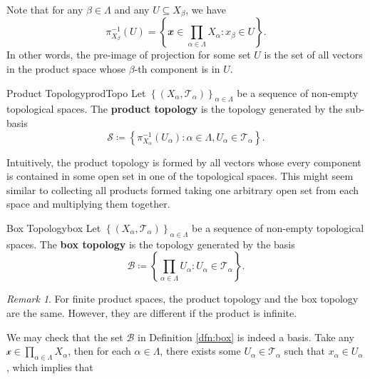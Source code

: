 \documentclass[math]{amznotes}
\theoremstyle{remark}
\newtheorem*{remark}{Remark}
\begin{document}
Note that for any $\beta \in \Lambda$ and any $U \subseteq X_{\beta}$, we have
\begin{equation*}
    \pi_{X_{\beta}}^{-1}\left(U\right) = \left\{\mathbfit{x} \in \prod_{\alpha \in \Lambda}X_{\alpha} \colon x_{\beta} \in U\right\}.
\end{equation*}
In other words, the pre-image of projection for some set $U$ is the set of all vectors in the product space whose $\beta$-th component is in $U$.
\begin{dfnbox}{Product Topology}{prodTopo}
    Let $\left\{\left(X_{\alpha}, \mathcal{T}_{\alpha}\right)\right\}_{\alpha \in \Lambda}$ be a sequence of non-empty topological spaces. The {\color{red} \textbf{product topology}} is the topology generated by the sub-basis 
    \begin{equation*}
        \mathcal{S} \coloneqq \left\{\pi_{X_{\alpha}}^{-1}\left(U_{\alpha}\right) \colon \alpha \in \Lambda, U_{\alpha} \in \mathcal{T}_{\alpha}\right\}.
    \end{equation*}
\end{dfnbox}
Intuitively, the product topology is formed by all vectors whose every component is contained in some open set in one of the topological spaces. This might seem similar to collecting all products formed taking one arbitrary open set from each space and multiplying them together.
\begin{dfnbox}{Box Topology}{box}
    Let $\left\{\left(X_{\alpha}, \mathcal{T}_{\alpha}\right)\right\}_{\alpha \in \Lambda}$ be a sequence of non-empty topological spaces. The {\color{red} \textbf{box topology}} is the topology generated by the basis 
    \begin{equation*}
        \mathcal{B} \coloneqq \left\{\prod_{\alpha \in \Lambda}U_{\alpha} \colon U_{\alpha} \in \mathcal{T}_{\alpha}\right\}.
    \end{equation*}
\end{dfnbox}
\begin{notebox}
    \begin{remark}
        For finite product spaces, the product topology and the box topology are the same. However, they are different if the product is infinite.
    \end{remark}
\end{notebox}
We may check that the set $\mathcal{B}$ in Definition \ref{dfn:box} is indeed a basis. Take any $\mathcal{x} \in \prod_{\alpha \in \Lambda}X_{\alpha}$, then for each $\alpha \in \Lambda$, there exists some $U_{\alpha} \in \mathcal{T}_{\alpha}$ such that $x_{\alpha} \in U_{\alpha}$, which implies that 
\end{document}
